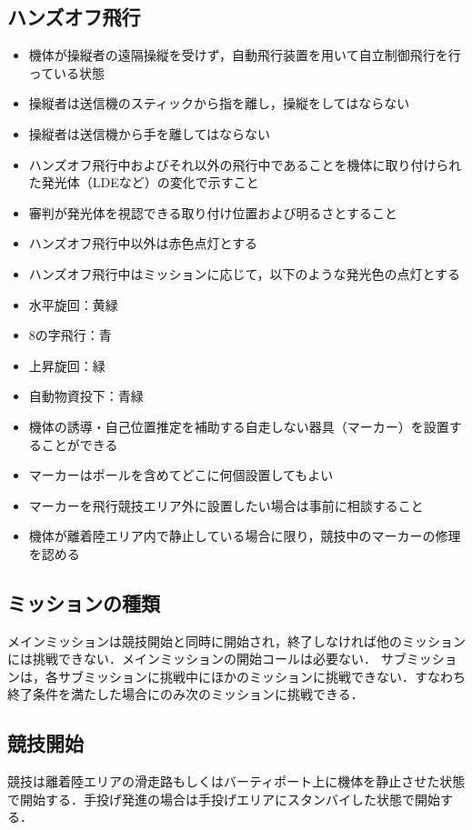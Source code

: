 \documentclass[a4paper,12pt,oneside]{jsarticle}
\begin{document}
\subsection{ハンズオフ飛行}
\begin{itemize}
  \item 機体が操縦者の遠隔操縦を受けず，自動飛行装置を用いて自立制御飛行を行っている状態
  \item 操縦者は送信機のスティックから指を離し，操縦をしてはならない
  \item 操縦者は送信機から手を離してはならない
  \item ハンズオフ飛行中およびそれ以外の飛行中であることを機体に取り付けられた発光体（LDEなど）の変化で示すこと
  \item 審判が発光体を視認できる取り付け位置および明るさとすること
  \item ハンズオフ飛行中以外は赤色点灯とする
  \item ハンズオフ飛行中はミッションに応じて，以下のような発光色の点灯とする
  \item 水平旋回：黄緑
  \item 8の字飛行：青
  \item 上昇旋回：緑
  \item 自動物資投下：青緑
  \item 機体の誘導・自己位置推定を補助する自走しない器具（マーカー）を設置することができる
  \item マーカーはポールを含めてどこに何個設置してもよい
  \item マーカーを飛行競技エリア外に設置したい場合は事前に相談すること
  \item 機体が離着陸エリア内で静止している場合に限り，競技中のマーカーの修理を認める
\end{itemize}

\subsection{ミッションの種類}
メインミッションは競技開始と同時に開始され，終了しなければ他のミッションには挑戦できない．メインミッションの開始コールは必要ない．
サブミッションは，各サブミッションに挑戦中にほかのミッションに挑戦できない．すなわち終了条件を満たした場合にのみ次のミッションに挑戦できる．

\subsection{競技開始}
競技は離着陸エリアの滑走路もしくはバーティポート上に機体を静止させた状態で開始する．手投げ発進の場合は手投げエリアにスタンバイした状態で開始する．
\end{document}
